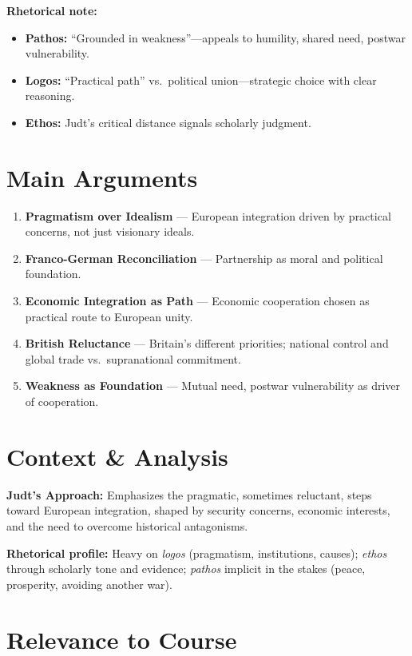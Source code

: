 \documentclass[11pt,a4paper]{article}
\begin{document}
\textbf{Rhetorical note:}
\begin{itemize}
\item \textbf{Pathos:} ``Grounded in weakness''---appeals to humility, shared need, postwar vulnerability.
\item \textbf{Logos:} ``Practical path'' vs.\ political union---strategic choice with clear reasoning.
\item \textbf{Ethos:} Judt's critical distance signals scholarly judgment.
\end{itemize}

\section*{Main Arguments}

\begin{enumerate}
\item \textbf{Pragmatism over Idealism} --- European integration driven by practical concerns, not just visionary ideals.
\item \textbf{Franco-German Reconciliation} --- Partnership as moral and political foundation.
\item \textbf{Economic Integration as Path} --- Economic cooperation chosen as practical route to European unity.
\item \textbf{British Reluctance} --- Britain's different priorities; national control and global trade vs.\ supranational commitment.
\item \textbf{Weakness as Foundation} --- Mutual need, postwar vulnerability as driver of cooperation.
\end{enumerate}

\section*{Context \& Analysis}

\textbf{Judt's Approach:} Emphasizes the pragmatic, sometimes reluctant, steps toward European integration, shaped by security concerns, economic interests, and the need to overcome historical antagonisms.

\textbf{Rhetorical profile:} Heavy on \textit{logos} (pragmatism, institutions, causes); \textit{ethos} through scholarly tone and evidence; \textit{pathos} implicit in the stakes (peace, prosperity, avoiding another war).

\section*{Relevance to Course}
\end{document}
